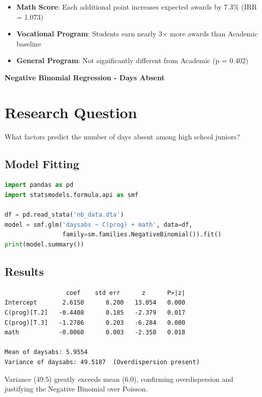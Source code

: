 \documentclass[12pt, a4paper]{article}
\newcounter{problemcounter}
\newcommand{\problemtitle}[1]{%
    \vspace{1cm}
    \begin{tcolorbox}[
        colback=DeepForest!5,
        colframe=DeepForest,
        arc=15pt,
        boxrule=1.2pt,
        left=20pt,
        right=20pt,
        top=12pt,
        bottom=12pt,
        enhanced,
        attach boxed title to top center={yshift=-8pt},
        boxed title style={
            colback=AmberSunset,
            colframe=DeepForest,
            arc=10pt,
            outer arc=10pt,
            boxrule=0.8pt,
            sharp corners,
            },
        title={\color{white}\large\sffamily\bfseries \faTasks \quad PROBLEM \arabic{problemcounter}}
    ]
        \centering
        {\color{DeepForest}\Large\bfseries\sffamily #1}
    \end{tcolorbox}
    \stepcounter{problemcounter}
    \vspace{0.3cm}
}
\begin{document}
\begin{itemize}
    \item \textbf{Math Score}: Each additional point increases expected awards by 7.3\% (IRR = 1.073)
    \item \textbf{Vocational Program}: Students earn nearly 3× more awards than Academic baseline
    \item \textbf{General Program}: Not significantly different from Academic (p = 0.402)
\end{itemize}

\newpage

\problemtitle{Negative Binomial Regression - Days Absent}

\section*{Research Question}
What factors predict the number of days absent among high school juniors?

\subsection*{Model Fitting}

\begin{lstlisting}[language=Python]
import pandas as pd
import statsmodels.formula.api as smf

df = pd.read_stata('nb_data.dta')
model = smf.glm('daysabs ~ C(prog) + math', data=df,
                family=sm.families.NegativeBinomial()).fit()
print(model.summary())
\end{lstlisting}

\subsection*{Results}

\begin{outputbox}
\begin{verbatim}
                 coef    std err      z      P>|z|
Intercept       2.6150      0.200   13.054   0.000
C(prog)[T.2]   -0.4408      0.185   -2.379   0.017
C(prog)[T.3]   -1.2786      0.203   -6.284   0.000
math           -0.0060      0.003   -2.358   0.018

Mean of daysabs: 5.9554
Variance of daysabs: 49.5187  (Overdispersion present)
\end{verbatim}
\end{outputbox}

\begin{insightbox}
Variance (49.5) greatly exceeds mean (6.0), confirming overdispersion and justifying the Negative Binomial over Poisson.
\end{insightbox}
\end{document}
